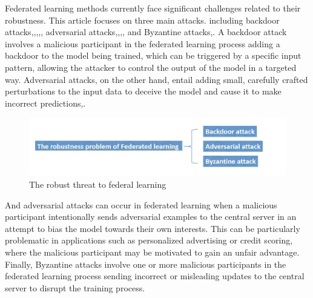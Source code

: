 \documentclass[conference]{IEEEtran}
\begin{document}
Federated learning methods currently face significant challenges related to their robustness. This article focuses on three main attacks. including backdoor attacks\cite{b24},\cite{b25},\cite{b26},\cite{b27},\cite{b28}, adversarial attacks\cite{b31},\cite{b32},\cite{b33},\cite{b34}, and Byzantine attacks\cite{b29},\cite{b30}. 
A backdoor attack involves a malicious participant in the federated learning process adding a backdoor to the model being trained, which can be triggered by a specific input pattern, 
allowing the attacker to control the output of the model in a targeted way. Adversarial attacks, on the other hand, entail adding small, 
carefully crafted perturbations to the input data to deceive the model and cause it to make incorrect predictions\cite{b31},\cite{b32}.   

\begin{figure}[htbp]
    \centerline{\includegraphics[width=0.8\linewidth,height=0.4\linewidth]{picture/f4.jpg}}
    \caption{The robust threat to federal learning}
    \label{fig2}
\end{figure}
And adversarial attacks can occur in federated learning when a malicious participant intentionally sends adversarial examples to the central server in an attempt to bias the model 
towards their own interests. This can be particularly problematic in applications such as personalized advertising or credit scoring, where the malicious participant may be motivated 
to gain an unfair advantage. Finally, Byzantine attacks involve one or more malicious participants in the federated learning process sending incorrect or misleading updates to the 
central server to disrupt the training process\cite{b35}.  
\end{document}
